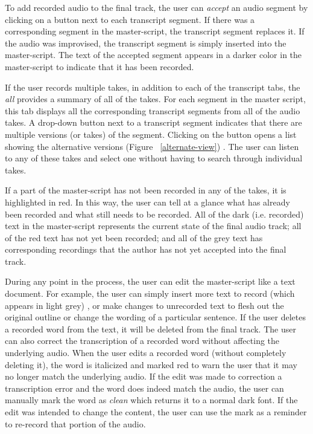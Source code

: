 
To add recorded audio to the final track, the user can \textit{accept} an audio segment by clicking on a button next to each transcript segment. If there was a corresponding segment in the master-script, the transcript segment replaces it. If the audio was improvised, the transcript segment is simply inserted into the master-script.  The text of the accepted segment appears in a darker color in the master-script to indicate that it has been recorded.

If the user records multiple takes, in addition to each of the transcript tabs, the \textit{all} provides a summary of all of the takes. For each segment in the master script, this tab displays all the corresponding transcript segments from all of the audio takes. A drop-down button next to a transcript segment  indicates that there are multiple versions (or takes)  of the  segment. Clicking on the button opens a list showing the alternative versions (Figure ~\ref{alternate-view}) . The user can listen to any of these takes and select one without having to search through individual takes. 

If a part of the master-script has not been recorded in any of the takes, it is highlighted in red. In this way, the user can tell at a glance what has already been recorded and what still needs to be recorded. All of the dark (i.e. recorded) text in the master-script represents the current state of the final audio track; all of the red text has not yet been recorded; and all of the grey text has corresponding recordings that the author has not yet accepted into the final track. 

During any point in the process, the user can edit the master-script like a text document.  For example, the user can simply insert more text to record (which appears in light grey) , or make changes to unrecorded text to flesh out the original outline or change the wording of a particular sentence. If the user deletes a recorded word from the text, it will be deleted from the final track. The user can also correct the transcription of a recorded word without affecting the underlying audio. When the user edits a recorded word (without completely deleting it), the word is italicized and marked red to warn the user that it may no longer match the underlying audio. If the edit was made to correction a transcription error and the word does indeed match the audio, the user can manually mark the word as \textit{clean} which returns it to a normal dark font. If the edit was intended to change the content, the user can use the mark as a reminder to re-record that portion of the audio.

